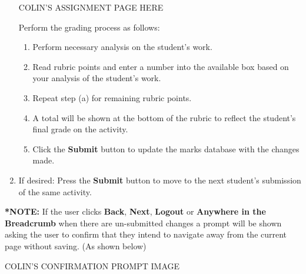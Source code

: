 \documentclass{article}
\begin{document}
\begin{enumerate}
\begin{center}
   COLIN'S ASSIGNMENT PAGE HERE
    \end{center}
    Perform the grading process as follows:
    \begin{enumerate}
      \item Perform necessary analysis on the student's work. 
      \item Read rubric points and enter a number into the available box 
      based on your analysis of the student's work.
      \item Repeat step (a) for remaining rubric points.
      \item A total will be shown at the bottom of the rubric to reflect the
       student's final grade on the activity.
      \item Click the \textbf{Submit} button to update the marks database with
      the changes made.
    \end{enumerate}

	\item If desired: Press the \textbf{Submit} button to move to the next student's
	submission of the same activity.
\end{enumerate}
\textbf{*NOTE: }If the user clicks \textbf{Back}, \textbf{Next}, \textbf{Logout} or \textbf{Anywhere in the Breadcrumb} when there are un-submitted changes a prompt will be shown asking the user to confirm that they intend to navigate away from the current page without saving. (As shown below)

	\begin{center}
      COLIN'S CONFIRMATION PROMPT IMAGE
    \end{center}
\end{document}
